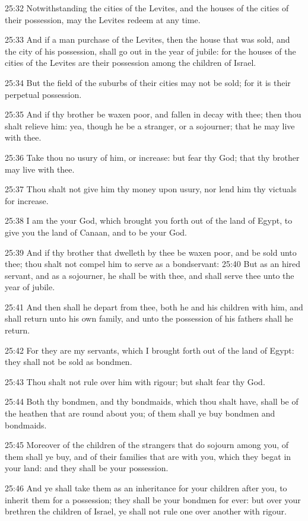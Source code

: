 25:32 Notwithstanding the cities of the Levites, and the houses of the
cities of their possession, may the Levites redeem at any time.

25:33 And if a man purchase of the Levites, then the house that was
sold, and the city of his possession, shall go out in the year of
jubile: for the houses of the cities of the Levites are their
possession among the children of Israel.

25:34 But the field of the suburbs of their cities may not be sold;
for it is their perpetual possession.

25:35 And if thy brother be waxen poor, and fallen in decay with thee;
then thou shalt relieve him: yea, though he be a stranger, or a
sojourner; that he may live with thee.

25:36 Take thou no usury of him, or increase: but fear thy God; that
thy brother may live with thee.

25:37 Thou shalt not give him thy money upon usury, nor lend him thy
victuals for increase.

25:38 I am the \LORD your God, which brought you forth out of the land
of Egypt, to give you the land of Canaan, and to be your God.

25:39 And if thy brother that dwelleth by thee be waxen poor, and be
sold unto thee; thou shalt not compel him to serve as a bondservant:
25:40 But as an hired servant, and as a sojourner, he shall be with
thee, and shall serve thee unto the year of jubile.

25:41 And then shall he depart from thee, both he and his children
with him, and shall return unto his own family, and unto the
possession of his fathers shall he return.

25:42 For they are my servants, which I brought forth out of the land
of Egypt: they shall not be sold as bondmen.

25:43 Thou shalt not rule over him with rigour; but shalt fear thy
God.

25:44 Both thy bondmen, and thy bondmaids, which thou shalt have,
shall be of the heathen that are round about you; of them shall ye buy
bondmen and bondmaids.

25:45 Moreover of the children of the strangers that do sojourn among
you, of them shall ye buy, and of their families that are with you,
which they begat in your land: and they shall be your possession.

25:46 And ye shall take them as an inheritance for your children after
you, to inherit them for a possession; they shall be your bondmen for
ever: but over your brethren the children of Israel, ye shall not rule
one over another with rigour.

